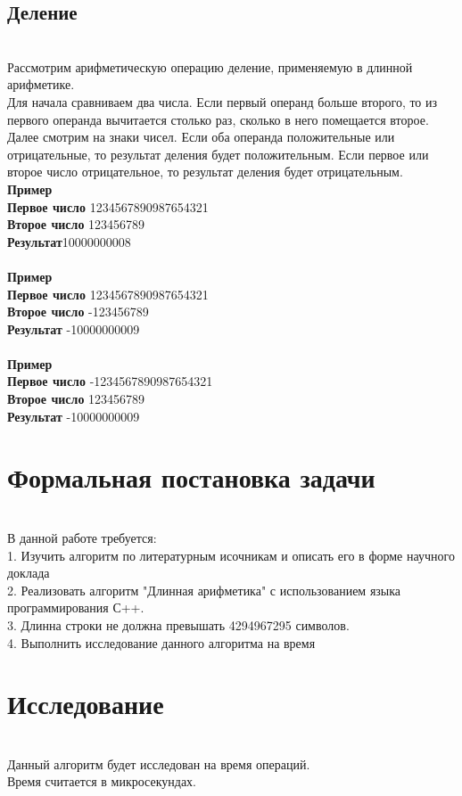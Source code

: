 \documentclass[a4paper]{article}
\begin{document}
\subsection{Деление}
\\Рассмотрим арифметическую операцию деление, применяемую в длинной арифметике.
\\Для начала сравниваем два числа. Если первый операнд больше второго, то из первого операнда вычитается столько раз, сколько в него помещается второе.
\\Далее смотрим на знаки чисел. Если оба операнда положительные или отрицательные, то результат деления будет положительным. Если первое или второе число отрицательное, то результат деления будет отрицательным.
\\ \textbf{Пример}
\\ \textbf{Первое число} 1234567890987654321
\\ \textbf{Второе число} 123456789
\\ \textbf{Результат}10000000008
\\
\\ \textbf{Пример}
\\ \textbf{Первое число} 1234567890987654321
\\ \textbf{Второе число} -123456789
\\ \textbf{Результат} -10000000009
\\
\\ \textbf{Пример}
\\ \textbf{Первое число} -1234567890987654321
\\ \textbf{Второе число} 123456789
\\ \textbf{Результат} -10000000009

\newpage

\section{Формальная постановка задачи}
\\В данной работе требуется:
\\1. Изучить алгоритм по литературным исочникам и описать его в форме научного доклада
\\2. Реализовать алгоритм "Длинная арифметика" с использованием языка программирования С++.
\\3. Длинна строки не должна превышать 4294967295 символов.
\\4. Выполнить исследование данного алгоритма на время
\newpage

\section{Исследование}
\\Данный алгоритм будет исследован на время операций.
\\Время считается в микросекундах.
\end{document}
